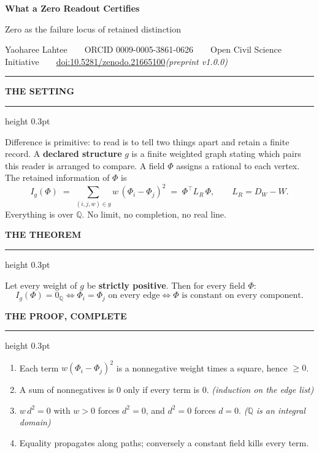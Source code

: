 \documentclass[10pt]{article}
\newcommand{\zQ}{0_{\mathbb{Q}}}
\newcommand{\hd}[1]{\par\vspace{0.10em}\noindent
  {\color{acc}\scriptsize\bfseries\MakeUppercase{#1}}\hspace{0.55em}%
  {\color{acc}\leaders\hrule height 0.3pt\hfill\kern0pt}\par\vspace{0.02em}}
\begin{document}
{\Large\bfseries What a Zero Readout Certifies}\par
\vspace{0.15em}
{\color{mut}\normalsize Zero as the failure locus of retained distinction}\par
\vspace{0.35em}
{\color{mut}\footnotesize Yaoharee Lahtee\ \ \textbullet\ \ ORCID 0009-0005-3861-0626\ \ \textbullet\ \ Open Civil Science Initiative\ \ \textbullet\ \ \href{https://doi.org/10.5281/zenodo.21665100}{doi:10.5281/zenodo.21665100}\hfill\itshape (preprint v1.0.0)}\par
\vspace{-0.2em}
{\color{ink}\rule{\linewidth}{0.8pt}}\par\vspace{-0.15em}\fontsize{9}{10.4}\selectfont

\hd{the setting}

Difference is primitive: to read is to tell two things apart and retain a finite record. A \textbf{declared structure} $g$ is a finite weighted graph stating which pairs this reader is arranged to compare. A field $\Phi$ assigns a rational to each vertex. The retained information of $\Phi$ is
\vspace{-0.5em}\[
I_g(\Phi)\;=\;\sum_{(i,j,w)\in g} w\,(\Phi_i-\Phi_j)^2
\;=\;\Phi^{\top}L_R\,\Phi,
\qquad L_R=D_W-W .
\]\vspace{-0.55em}
Everything is over $\mathbb{Q}$. No limit, no completion, no real line.

\hd{the theorem}

\begin{tcolorbox}[colback=pale,colframe=ink,boxrule=0.9pt,arc=1pt,left=9pt,right=9pt,top=4pt,bottom=4pt]
Let every weight of $g$ be \textbf{strictly positive}. Then for every field $\Phi$:
\[
I_g(\Phi)=\zQ
\iff
\Phi_i=\Phi_j \text{ on every edge}
\iff
\Phi \text{ is constant on every component.}
\]
\end{tcolorbox}

\hd{the proof, complete}

\begin{enumerate}[leftmargin=1.45em,itemsep=0pt,topsep=0pt,parsep=0pt]
\item Each term $w(\Phi_i-\Phi_j)^2$ is a nonnegative weight times a square, hence $\ge 0$.
\item A sum of nonnegatives is $0$ only if every term is $0$. \hfill{\color{mut}\itshape(induction on the edge list)}
\item $w\,d^2=0$ with $w>0$ forces $d^2=0$, and $d^2=0$ forces $d=0$. \hfill{\color{mut}\itshape($\mathbb{Q}$ is an integral domain)}
\item Equality propagates along paths; conversely a constant field kills every term.
\end{enumerate}
\end{document}
